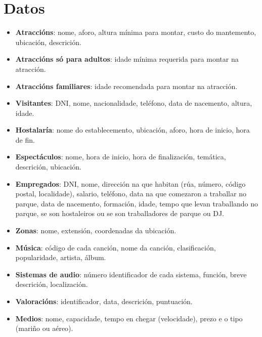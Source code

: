\documentclass[12pt,a4paper]{book}
\theoremstyle{definition}
\theoremstyle{break}
\begin{document}
	\section{Datos}
	\begin{itemize}
		\item \textbf{Atraccións}: nome, aforo, altura mínima para montar, custo do mantemento, ubicación, descrición.
		
		\item \textbf{Atraccións só para adultos}: idade mínima requerida para montar na atracción.
		
		\item \textbf{Atraccións familiares}: idade recomendada para montar na atracción.
		
		\item \textbf{Visitantes}: DNI, nome, nacionalidade, teléfono, data de nacemento, altura, idade.
		
		\item \textbf{Hostalaría}: nome do establecemento, ubicación, aforo, hora de inicio, hora de fin.
		
		\item \textbf{Espectáculos}: nome, hora de inicio, hora de finalización, temática, descrición, ubicación.
		
		\item \textbf{Empregados}: DNI, nome, dirección na que habitan (rúa, número, código postal, localidade), salario, teléfono, data na que comezaron a traballar no parque, data de nacemento, formación, idade, tempo que levan traballando no parque, se son hostaleiros ou se son traballadores de parque ou DJ.
		
		\item \textbf{Zonas}: nome, extensión, coordenadas da ubicación.
		
		\item \textbf{Música}: código de cada canción, nome da canción, clasificación, popularidade, artista, álbum.
		
		\item \textbf{Sistemas de audio}: número identificador de cada sistema, función, breve
		descrición, localización.
		
		\item \textbf{Valoracións}: identificador, data, descrición, puntuación.
		
		\item \textbf{Medios}: nome, capacidade, tempo en chegar (velocidade), prezo e o tipo (mariño ou aéreo).
	\end{itemize}
	
\end{document}
